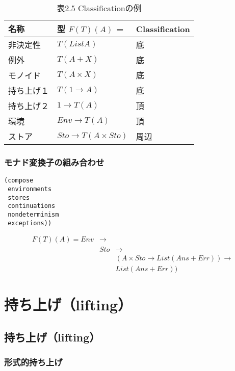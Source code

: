 \documentclass[11pt, oneside]{jsarticle}   	%
\begin{document}
\begin{table}[htb]
\label{table2.5}
\caption{表2.5 Classificationの例}
  \begin{tabular}{| l | l | l |} \hline
    名称   & 型 $F(T)(A)$ = & Classification  \\ \hline \hline
    非決定性     & $T(List A)$ & 底  \\
    例外            & $T(A + X)$ & 底  \\
    モノイド     & $T(A \times X)$ & 底  \\
    持ち上げ１ & $T(1 \rightarrow A)$ & 底  \\
    持ち上げ２ & $1 \rightarrow T(A) $ & 頂  \\
    環境            & $Env \rightarrow T(A) $ & 頂  \\ 
    ストア        &  $Sto \rightarrow T(A \times Sto) $ & 周辺  \\ \hline
  \end{tabular}
\end{table}
\subsubsection{ モナド変換子の組み合わせ }

\begin{lstlisting}
(compose
 environments
 stores
 continuations
 nondeterminism
 exceptions))
\end{lstlisting}
 
 $$
\begin{array}{lll}
F(T)(A) = Env &\rightarrow 	& 				 \\
			   &Sto 			&\rightarrow  	 \\
			   &				& (A \times  Sto \rightarrow List(Ans + Err)) \rightarrow \\
			   &				&				 List(Ans + Err))
\end{array}
 $$
 
\theendnotes
\setcounter{endnote}{0}

\newpage
\section{ 持ち上げ（lifting）}
\subsection{ 持ち上げ（lifting） }
\subsubsection{  形式的持ち上げ }
\end{document}

